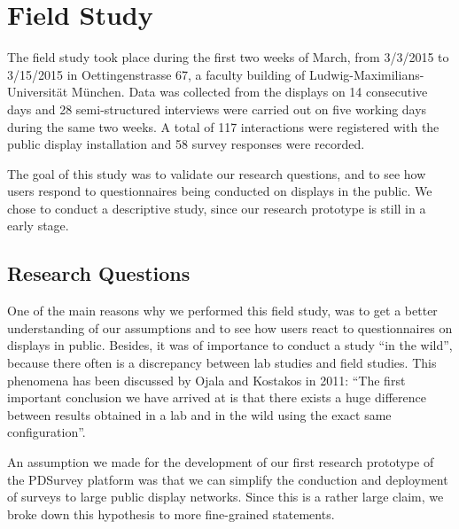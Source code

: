 \section{Field Study}
\label{sec:field-study}


	The field study took place during the first two weeks of March, from 3/3/2015 to 3/15/2015 in Oettingenstrasse 67, a faculty building of Ludwig-Maximilians-Universit\"at M\"unchen. Data was collected from the displays on 14 consecutive days and 28 semi-structured interviews were carried out on five working days during the same two weeks. A total of 117 interactions were registered with the public display installation and 58 survey responses were recorded.

	The goal of this study was to validate our research questions, and to see how users respond to questionnaires being conducted on displays in the public. We chose to conduct a descriptive study, since our research prototype is still in a early stage.




\subsection{Research Questions}

	One of the main reasons why we performed this field study, was to get a better understanding of our assumptions and to see how users react to questionnaires on displays in public. Besides, it was of importance to conduct a study ``in the wild'', because there often is a discrepancy between lab studies and field studies. This phenomena has been discussed by Ojala and Kostakos in 2011: ``The first important conclusion we have arrived at is that there exists a huge difference between results obtained in a lab and in the wild using the exact same configuration''\cite{Ojala2011}.

	An assumption we made for the development of our first research prototype of the PDSurvey platform was that we can simplify the conduction and deployment of surveys to large public display networks. Since this is a rather large claim, we broke down this hypothesis to more fine-grained statements. 

